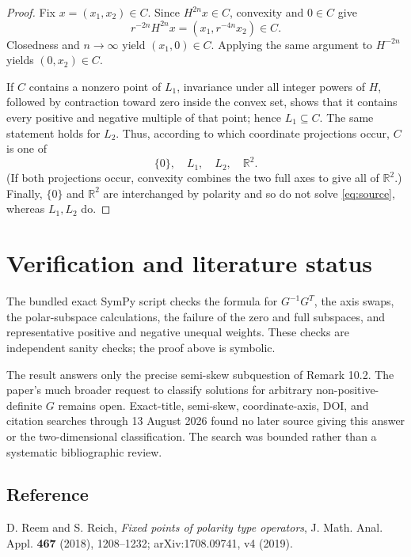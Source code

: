 \documentclass[11pt]{article}
\newcommand{\R}{\mathbb R}
\begin{document}
\begin{proof}
Fix \(x=(x_1,x_2)\in C\).  Since \(H^{2n}x\in C\), convexity and \(0\in C\)
give
\[
 r^{-2n}H^{2n}x=(x_1,r^{-4n}x_2)\in C.
\]
Closedness and \(n\to\infty\) yield \((x_1,0)\in C\).  Applying the same
argument to \(H^{-2n}\) yields \((0,x_2)\in C\).

If \(C\) contains a nonzero point of \(L_1\), invariance under all integer
powers of \(H\), followed by contraction toward zero inside the convex set,
shows that it contains every positive and negative multiple of that point;
hence \(L_1\subseteq C\).  The same statement holds for \(L_2\).  Thus,
according to which coordinate projections occur, \(C\) is one of
\[
 \{0\},\quad L_1,\quad L_2,\quad\R^2.
\]
(If both projections occur, convexity combines the two full axes to give
all of \(\R^2\).)  Finally, \(\{0\}\) and \(\R^2\) are interchanged by
polarity and so do not solve \eqref{eq:source}, whereas \(L_1,L_2\) do.
\end{proof}

\small
\section*{Verification and literature status}
The bundled exact SymPy script checks the formula for \(G^{-1}G^T\), the
axis swaps, the polar-subspace calculations, the failure of the zero and
full subspaces, and representative positive and negative unequal weights.
These checks are independent sanity checks; the proof above is symbolic.

The result answers only the precise semi-skew subquestion of Remark 10.2.
The paper's much broader request to classify solutions for arbitrary
non-positive-definite \(G\) remains open.  Exact-title, semi-skew,
coordinate-axis, DOI, and citation searches through 13 August 2026 found no
later source giving this answer or the two-dimensional classification.  The
search was bounded rather than a systematic bibliographic review.

\subsection*{Reference}
\noindent [1] D. Reem and S. Reich,
\emph{Fixed points of polarity type operators},
J. Math. Anal. Appl. \textbf{467} (2018), 1208--1232;
arXiv:1708.09741, v4 (2019).
\end{document}
